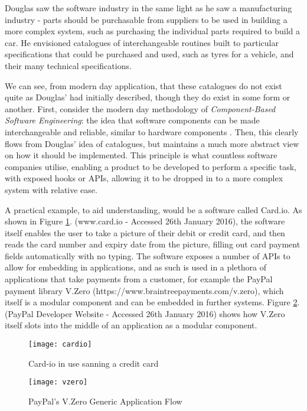 Douglas saw the software industry in the same light as he saw a manufacturing industry - parts should be purchasable from suppliers to be used in building a more complex system, such as purchasing the individual parts required to build a car. He envisioned catalogues of interchangeable routines built to particular specifications that could be purchased and used, such as tyres for a vehicle, and their many technical specifications.

We can see, from modern day application, that these catalogues do not exist quite as Douglas' had initially described, though they do exist in some form or another. 
First, consider the modern day methodology of \textit{Component-Based Software Engineering}: the idea that software components can be made interchangeable and reliable, similar to hardware components \cite{Foukalas2005}. 
Then, this clearly flows from Douglas' idea of catalogues, but maintains a much more abstract view on how it should be implemented. 
This principle is what countless software companies utilise, enabling a product to be developed to perform a specific task, with exposed hooks or APIs, allowing it to be dropped in to a more complex system with relative ease.

A practical example, to aid understanding, would be a software called Card.io. 
As shown in Figure \ref{cardioscan}. (www.card.io - Accessed 26th January 2016), the software itself enables the user to take a picture of their debit or credit card, and then reads the card number and expiry date from the picture, filling out card payment fields automatically with no typing. 
The software exposes a number of APIs to allow for embedding in applications, and as such is used in a plethora of applications that take payments from a customer, for example the PayPal payment library V.Zero (https://www.braintreepayments.com/v.zero), which itself is a modular component and can be embedded in further systems. 
Figure \ref{vzeroflow}. (PayPal Developer Website - Accessed 26th January 2016) shows how V.Zero itself slots into the middle of an application as a modular component.

\begin{figure}[ht!]
\centering
\texttt{[image: cardio]}
\caption{Card-io in use sanning a credit card \label{cardioscan}}
\end{figure}



\begin{figure}[ht!]
\centering
\texttt{[image: vzero]}
\caption{PayPal's V.Zero Generic Application Flow \label{vzeroflow}}
\end{figure}

